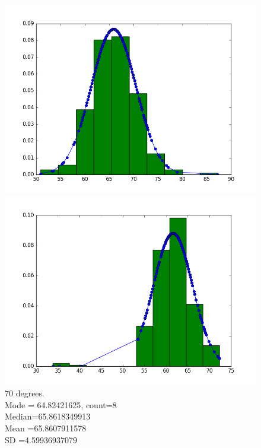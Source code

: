 \documentclass[12pt]{article}
\numberwithin{figure}{section}
\numberwithin{table}{section}
\begin{document}
\begin{figure}[H]
  \centering
  \begin{minipage}[b]{0.4\textwidth}
    \includegraphics[width=\textwidth]{angle70.png}
    \caption[Estimation at angle 70 degrees]{70 degrees.
    \\\hspace{\textwidth}Mode   = 64.82421625, count=8
	\\\hspace{\textwidth}	Median=65.8618349913
	\\\hspace{\textwidth}	Mean   =65.8607911578
	\\\hspace{\textwidth}	SD       =4.59936937079}
  \end{minipage}
  \hfill
  \begin{minipage}[b]{0.4\textwidth}
    \includegraphics[width=\textwidth]{angle60.png}

\end{minipage}
\end{figure}
\end{document}
